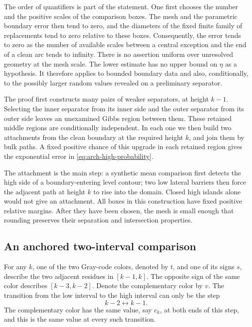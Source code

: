 The order of quantifiers is part of the statement.  One first chooses the
number and the positive scales of the comparison boxes.  The mesh and the
parametric boundary error then tend to zero, and the diameters of the fixed
finite family of replacements tend to zero relative to these boxes.
Consequently, the error tends to zero as the number of available scales
between a central exception and the end of a clean arc tends to infinity.
There is no assertion uniform over unresolved geometry at the mesh scale.
The lower estimate has no upper bound on $\eta$ as a hypothesis.  It
therefore applies to bounded boundary data and also, conditionally, to the
possibly larger random values revealed on a preliminary separator.

The proof first constructs many pairs of weaker separators, at height
$k-1$.  Selecting the inner separator from its inner side and the outer
separator from its outer side leaves an unexamined Gibbs region between
them.  These retained middle regions are conditionally independent.  In
each one we then build two attachments from the clean boundary at the
required height $k$, and join them by bulk paths.  A fixed positive chance
of this upgrade in each retained region gives the exponential error in
\eqref{eq:arch-high-probability}.

The attachment is the main step: a synthetic mean comparison first detects
the high side of a boundary-entering level contour; two low lateral
barriers then force the adjacent path at height $k$ to rise into the domain.
Closed high islands alone would not give an attachment.  All boxes in this construction
have fixed positive relative margins.  After they have been chosen, the
mesh is small enough that rounding preserves their separation and
intersection properties.

\subsection{An anchored two-interval comparison}

For any $k$, one of the two Gray-code colors, denoted by $t$, and one of its
signs $s$, describe the two adjacent residues in $[k-1,k]$.  The opposite
sign of the same color describes $[k-3,k-2]$.  Denote the complementary
color by $v$.  The transition from the low interval to the high interval
can only be the step
\begin{equation}\label{eq:anchored-transition}
                  k-2\longleftrightarrow k-1.
\end{equation}
The complementary color has the same value, say $c_k$, at both ends of
this step, and this is the same value at every such transition.

